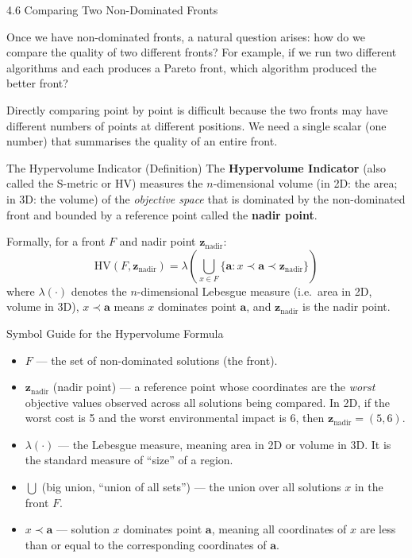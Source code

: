 \documentclass[aspectratio=169,10pt]{beamer}
\begin{document}
\begin{frame}[allowframebreaks]{4.6 Comparing Two Non-Dominated Fronts}

  Once we have non-dominated fronts, a natural question arises: how do we compare
  the quality of two different fronts?  For example, if we run two different
  algorithms and each produces a Pareto front, which algorithm produced the better
  front?

  Directly comparing point by point is difficult because the two fronts may have
  different numbers of points at different positions.  We need a single scalar
  (one number) that summarises the quality of an entire front.

  \begin{block}{The Hypervolume Indicator (Definition)}
    The \textbf{Hypervolume Indicator} (also called the S-metric or HV) measures
    the $n$-dimensional volume (in 2D: the area; in 3D: the volume) of the
    \emph{objective space} that is dominated by the non-dominated front and
    bounded by a reference point called the \textbf{nadir point}.

    Formally, for a front $F$ and nadir point $\mathbf{z}_{\text{nadir}}$:
    \[
      \text{HV}(F, \mathbf{z}_{\text{nadir}})
        = \lambda\!\left(
            \bigcup_{x \in F}
            \bigl\{ \mathbf{a} : x \prec \mathbf{a} \prec \mathbf{z}_{\text{nadir}} \bigr\}
          \right)
    \]
    where $\lambda(\cdot)$ denotes the $n$-dimensional Lebesgue measure (i.e.\
    area in 2D, volume in 3D), $x \prec \mathbf{a}$ means $x$ dominates point
    $\mathbf{a}$, and $\mathbf{z}_{\text{nadir}}$ is the nadir point.
  \end{block}

  \framebreak

  \begin{block}{Symbol Guide for the Hypervolume Formula}
    \begin{itemize}
      \item $F$ --- the set of non-dominated solutions (the front).
      \item $\mathbf{z}_{\text{nadir}}$ (nadir point) --- a reference point
        whose coordinates are the \emph{worst} objective values observed across
        all solutions being compared.  In 2D, if the worst cost is 5 and the
        worst environmental impact is 6, then $\mathbf{z}_{\text{nadir}} = (5, 6)$.
      \item $\lambda(\cdot)$ --- the Lebesgue measure, meaning area in 2D or
        volume in 3D.  It is the standard measure of ``size'' of a region.
      \item $\bigcup$ (big union, ``union of all sets'') --- the union over
        all solutions $x$ in the front $F$.
      \item $x \prec \mathbf{a}$ --- solution $x$ dominates point $\mathbf{a}$,
        meaning all coordinates of $x$ are less than or equal to the
        corresponding coordinates of $\mathbf{a}$.
    \end{itemize}
  \end{block}


\end{frame}
\end{document}
